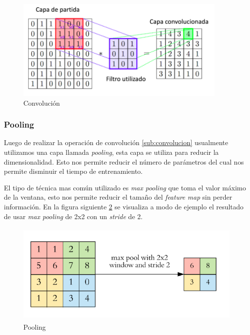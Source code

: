 \begin{figure}[H]
 \centering
  \includegraphics[height=5cm,keepaspectratio=true,clip=true]{imagenes/MarcoTeorico/convolucion.png}
  \caption{Convolución} \label{Fig:convolucion}
\end{figure}
\subsubsection{Pooling}\label{sub:pooling}

Luego de realizar la operación de convolución \ref{sub:convolucion} usualmente utilizamos una capa llamada \textit{pooling}, esta capa se utiliza para reducir la dimensionalidad. Esto nos permite reducir el número de parámetros del cual nos permite disminuir el tiempo de entrenamiento.

El tipo de técnica mas común utilizado es \textit{max pooling} que toma el valor máximo de la ventana, esto nos permite reducir el tamaño del \textit{feature map} sin perder información. En la figura siguiente \ref{Fig:Pooling} se visualiza a modo de ejemplo el resultado de usar \textit{max pooling} de 2x2 con un \textit{stride} de 2.

\begin{figure}[H]
 \centering
  \includegraphics[height=5cm,keepaspectratio=true,clip=true]{imagenes/MarcoTeorico/pooling_1.png}
  \caption{Pooling} \label{Fig:Pooling}
\end{figure}

